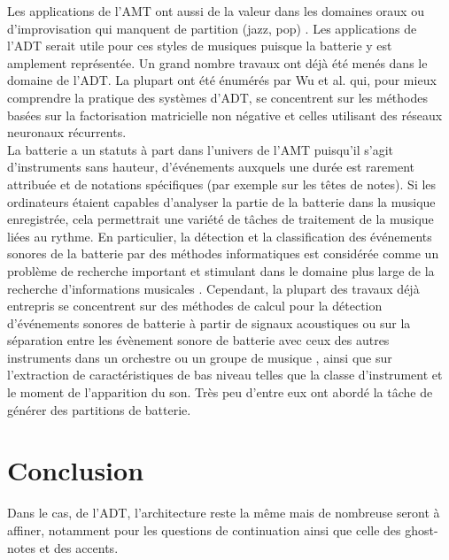 Les applications de l’AMT ont aussi de la valeur dans les domaines oraux ou d’improvisation qui manquent de partition (jazz, pop) \cite{article1}. Les applications de l’ADT serait utile pour ces styles de musiques puisque la batterie y est amplement représentée. Un grand nombre travaux ont déjà été menés dans le domaine de l’ADT. La plupart ont été énumérés par Wu et al. \cite{8350302} qui, pour mieux comprendre la pratique des systèmes d’ADT, se concentrent sur les méthodes basées sur la factorisation matricielle non négative et celles utilisant des réseaux neuronaux récurrents.\\
La batterie a un statuts à part dans l’univers de l’AMT puisqu'il s'agit d'instruments sans hauteur, d'événements auxquels une durée est rarement attribuée et de notations spécifiques (par exemple sur les têtes de notes). Si les ordinateurs étaient capables d'analyser la partie de la batterie dans la musique enregistrée, cela permettrait une variété de tâches de traitement de la musique liées au rythme. En particulier, la détection et la classification des événements sonores de la batterie par des méthodes informatiques est considérée comme un problème de recherche important et stimulant dans le domaine plus large de la recherche d'informations musicales \cite{8350302}. Cependant, la plupart des travaux déjà entrepris se concentrent sur des méthodes de calcul pour la détection d'événements sonores de batterie à partir de signaux acoustiques ou sur la séparation entre les évènement sonore de batterie avec ceux des autres instruments dans un orchestre ou un groupe de musique \cite{2802}, ainsi que sur l'extraction de caractéristiques de bas niveau telles que la classe d'instrument et le moment de l'apparition du son. Très peu d'entre eux ont abordé la tâche de générer des partitions de batterie.
\section{Conclusion}
Dans le cas, de l’ADT, l’architecture reste la même mais de nombreuse seront à affiner, notamment pour les questions de continuation ainsi que celle des ghost-notes et des accents.